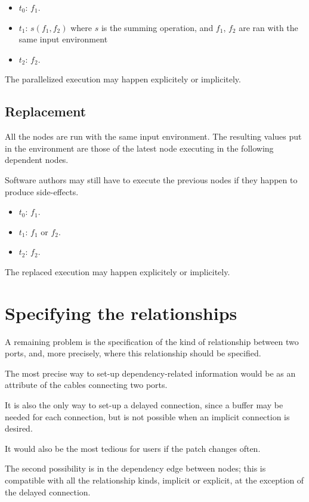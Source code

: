 \documentclass{article}
\begin{document}
\begin{itemize}
  \item $t_0$: $f_1$.
  \item $t_1$: $s(f_1, f_2)$ where $s$ is the summing operation, and $f_1$, $f_2$ are ran with the same input environment
  \item $t_2$: $f_2$. 
\end{itemize}
     
The parallelized execution may happen explicitely or implicitely.

\subsection{Replacement}
All the nodes are run with the same input environment. 
The resulting values put in the environment are those of the latest node executing in the following dependent nodes.
    
Software authors may still have to execute the previous nodes if they happen to produce side-effects.
    
\begin{itemize}
  \item $t_0$: $f_1$.
  \item $t_1$: $f_1$ or $f_2$.
  \item $t_2$: $f_2$. 
\end{itemize}

The replaced execution may happen explicitely or implicitely.
    
\section{Specifying the relationships}
A remaining problem is the specification of the kind of relationship between two ports, and, more precisely, 
where this relationship should be specified.

The most precise way to set-up dependency-related information would be as an attribute of 
the cables connecting two ports. 

It is also the only way to set-up a delayed connection, since a buffer may be needed for each connection, but is not possible when an implicit connection is desired.

It would also be the most tedious for users if the patch changes often.

The second possibility is in the dependency edge between nodes; this is compatible with all the relationship kinds, implicit or explicit, at the exception of the delayed connection.
\end{document}
